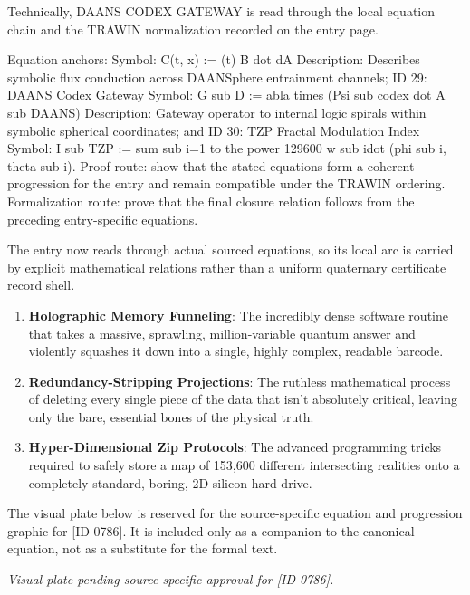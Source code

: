 Technically, DAANS CODEX GATEWAY is read through the local equation chain and the TRAWIN normalization recorded on the entry page.

Equation anchors: Symbol: C(t, x) :=    (t)   B  dot dA Description: Describes symbolic flux conduction across DAANSphere entrainment channels; ID 29: DAANS Codex Gateway Symbol: G sub D := abla times (Psi sub codex dot A  sub DAANS) Description: Gateway operator to internal logic spirals within symbolic spherical coordinates; and ID 30: TZP Fractal Modulation Index Symbol: I sub TZP := sum sub i=1 to the power 129600 w sub idot (phi sub i, theta sub i). Proof route: show that the stated equations form a coherent progression for the entry and remain compatible under the TRAWIN ordering. Formalization route: prove that the final closure relation follows from the preceding entry-specific equations.

The entry now reads through actual sourced equations, so its local arc is carried by explicit mathematical relations rather than a uniform quaternary certificate record shell.
\endgroup

\begin{enumerate}[leftmargin=1.6em,itemsep=6pt,topsep=4pt]
\item \textbf{Holographic Memory Funneling}: The incredibly dense software routine that takes a massive, sprawling, million-variable quantum answer and violently squashes it down into a single, highly complex, readable barcode.
\item \textbf{Redundancy-Stripping Projections}: The ruthless mathematical process of deleting every single piece of the data that isn't absolutely critical, leaving only the bare, essential bones of the physical truth.
\item \textbf{Hyper-Dimensional Zip Protocols}: The advanced programming tricks required to safely store a map of 153,600 different intersecting realities onto a completely standard, boring, 2D silicon hard drive.
\end{enumerate}

\begingroup\footnotesize\sloppy
The visual plate below is reserved for the source-specific equation and progression graphic for [ID 0786]. It is included only as a companion to the canonical equation, not as a substitute for the formal text.
\par\endgroup
\begingroup\footnotesize\itshape
Visual plate pending source-specific approval for [ID 0786].
\par\endgroup

